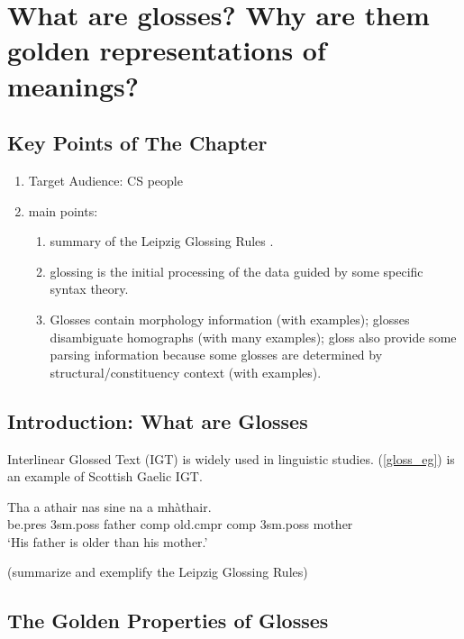 \chapter{What are glosses? Why are them golden representations of meanings?}
\label{chap:gloss}

\section{Key Points of The Chapter}
	\begin{enumerate}
	\item Target Audience: CS people
	\item main points:
		\begin{enumerate}
    	\item summary of the Leipzig Glossing Rules \citep{bickel2008leipzig}.  
		\item glossing is the initial processing of the data guided by some specific syntax theory. 
    	\item Glosses contain morphology information (with examples); glosses disambiguate homographs (with many examples); gloss also provide some parsing information because some glosses are determined by structural/constituency context (with examples).       
		\end{enumerate}
 
	\end{enumerate}

\section{Introduction: What are Glosses}

Interlinear Glossed Text (IGT) is widely used in linguistic studies. (\ref{gloss_eg}) is an example of Scottish Gaelic IGT.
\begin{exe}  
\ex\label{gloss_eg} \gll    Tha a athair nas sine na a mh\`athair.\\  
            be.pres 3sm.poss father comp old.cmpr comp 3sm.poss mother
\\  
    \glt    `His father is older than his mother.'  
\end{exe}

(summarize and exemplify the Leipzig Glossing Rules)


\section{The Golden Properties of Glosses}


